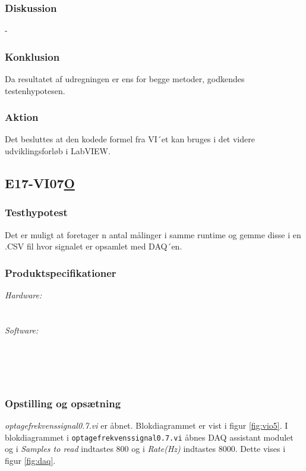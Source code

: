 		\subsubsection{Diskussion} 
	-
	
	
		\subsubsection{Konklusion}
		 
Da resultatet af udregningen er ens for begge metoder, godkendes testenhypotesen.  
	
	   \subsubsection{Aktion}
Det besluttes at den kodede formel fra VI´et kan bruges i det videre udviklingsforløb i LabVIEW. 


\subsection{E17-VI07\underline{O}}
\subsubsection{Testhypotest}
Det er muligt at foretager n antal målinger i samme runtime og gemme disse i en .CSV fil hvor signalet er opsamlet med DAQ´en. 
\subsubsection{Produktspecifikationer}
\textit{Hardware:}\\
		\PC\\
		\daq\\
	
		\textit{Software:}\\
		\labview\\
		\visa\\
		\vi\\
		\daqsoft\\
\subsubsection{Opstilling og opsætning}
\textit{optagefrekvenssignal0.7.vi} er åbnet. Blokdiagrammet er vist i figur \ref{fig:vio5}. I blokdiagrammet i \texttt{optagefrekvenssignal0.7.vi} åbnes DAQ assistant modulet og i \textit{Samples to read} indtastes 800 og i \textit{Rate(Hz)} indtastes 8000. Dette vises i figur \ref{fig:daq}.   
		
